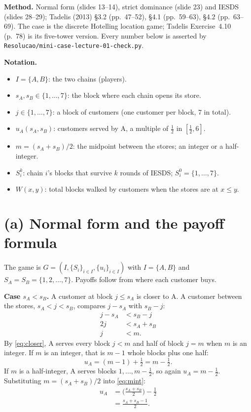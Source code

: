 \documentclass[11pt,a4paper]{article}
\newenvironment{notacao}{\par\smallskip\noindent\textbf{Notation.}\begin{itemize}[leftmargin=1.4em,topsep=1pt,itemsep=0pt]\small}{\end{itemize}}
\begin{document}
\textbf{Method.} Normal form (slides 13--14), strict dominance (slide 23) and IESDS
(slides 28--29); Tadelis (2013) \S3.2 (pp.~47--52), \S4.1 (pp.~59--63), \S4.2 (pp.~63--69). The
case is the discrete Hotelling location game; Tadelis Exercise~4.10 (p.~78) is its five-tower
version. Every number below is asserted by \texttt{Resolucao/mini-case-lecture-01-check.py}.

\begin{notacao}
  \item $I = \{A, B\}$: the two chains (players).
  \item $s_A, s_B \in \{1, \dots, 7\}$: the block where each chain opens its store.
  \item $j \in \{1, \dots, 7\}$: a block of customers (one customer per block, 7 in total).
  \item $u_A(s_A, s_B)$: customers served by A, a multiple of $\tfrac12$ in $[\tfrac12, 6]$.
  \item $m = (s_A + s_B)/2$: the midpoint between the stores; an integer or a half-integer.
  \item $S_i^k$: chain $i$'s blocks that survive $k$ rounds of IESDS; $S_i^0 = \{1, \dots, 7\}$.
  \item $W(x, y)$: total blocks walked by customers when the stores are at $x \le y$.
\end{notacao}

\section*{(a) Normal form and the payoff formula}

The game is $G = (I, \{S_i\}_{i \in I}, \{u_i\}_{i \in I})$ with $I = \{A, B\}$ and
$S_A = S_B = \{1, 2, \dots, 7\}$. Payoffs follow from where each customer buys.

\textbf{Case $s_A < s_B$.} A customer at block $j \le s_A$ is closer to A. A customer between the
stores, $s_A < j < s_B$, compares $j - s_A$ with $s_B - j$:
\begin{align}
  j - s_A &< s_B - j \nonumber\\
  2j &< s_A + s_B \nonumber\\
  j &< m. \label{eq:closer}
\end{align}
By \eqref{eq:closer}, A serves every block $j < m$ and half of block $j = m$ when $m$ is an
integer. If $m$ is an integer, that is $m - 1$ whole blocks plus one half:
\begin{equation}
  u_A = (m - 1) + \tfrac12 = m - \tfrac12. \label{eq:mint}
\end{equation}
If $m$ is a half-integer, A serves blocks $1, \dots, m - \tfrac12$, so again $u_A = m - \tfrac12$.
Substituting $m = (s_A + s_B)/2$ into \eqref{eq:mint}:
\begin{align}
  u_A &= \Big(\frac{s_A + s_B}{2}\Big) - \frac12 \nonumber\\
      &= \frac{s_A + s_B - 1}{2}. \label{eq:left}
\end{align}
\end{document}
